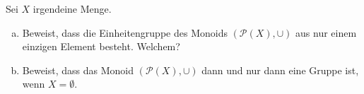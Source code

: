\begin{aufg}
Sei $X$ irgendeine Menge.
\begin{enumerate}[a)]
 \item Beweist, dass die Einheitengruppe des Monoids $(\mathcal{P}(X),\cup)$ aus nur einem einzigen Element besteht. Welchem?
 \item Beweist, dass das Monoid $(\mathcal{P}(X),\cup)$ dann und nur dann eine Gruppe ist, wenn $X=\emptyset$.
\end{enumerate}
\end{aufg}
\begin{comment}
\subsection{Aufgabe}
Sei $X$ eine beliebige Menge. Es bezeichne
\[ \text{Rel}(X) := \{{\sim}\mid {\sim}\ \text{ist eine zweistellige Relation auf $X$} \} \]
die Menge aller Relationen auf $X$. Für zwei Relationen ${\sim_1},{\sim_2}\in \text{Rel}(X)$ sei die Relation „$\sim_1\land \sim_2$“ definiert durch
\begin{align*}
 x\ (\sim_1 \land \sim_2)\ y  \qquad:\Leftrightarrow\qquad x\sim_1 y\ \text{und}\ x\sim_2 y && x,y\in X
\end{align*}
\begin{enumerate}[a)]
 \item Sei $X=\Rz$. Bestimmt die Relation $\sim_1\land \sim_2$ in den folgenden drei Fällen:
 \begin{align*}
  {\sim_1} = \text{„$\leq$“} \quad \text{und}\quad {\sim_2} = \text{„$\geq$“} \\
  {\sim_1} = \text{„$\leq$“} \quad \text{und}\quad {\sim_2} = \text{„$\neq$“} \\
  {\sim_1} = \text{„$<$“} \quad \text{und}\quad {\sim_2} = \text{„$>$“} 
 \end{align*}
\item Zeigt, dass $(\text{Rel}(X),\land)$ ein kommutatives Monoid ist. Was ist das neutrale Element?
\end{enumerate}






\end{comment}
